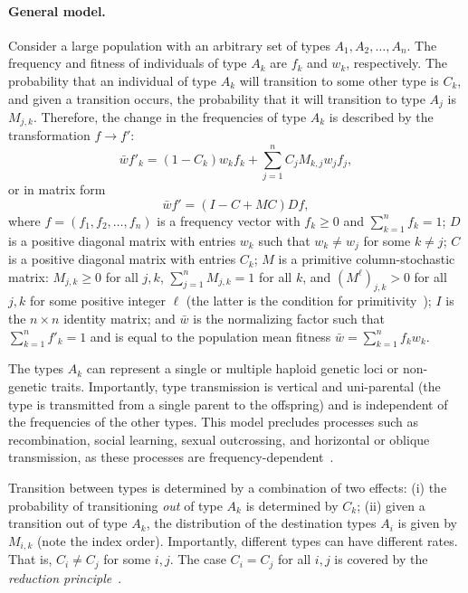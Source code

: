 \documentclass[12pt, twocolumn]{extarticle}
\newcommand{\ci}{I}
\begin{document}
\paragraph*{General model.}\label{sec:general_model}
Consider a large  population with an arbitrary set of types $A_1, A_2, \ldots, A_n$.
The frequency and fitness of individuals of type $A_k$ are $f_k$ and $w_k$, respectively.
The probability that an individual of type $A_k$ will transition to some other type is $C_k$, and given a transition occurs, the probability that it will transition to type $A_j$ is $M_{j,k}$.
Therefore, the change in the frequencies of type $A_k$ is described by the transformation $f \to f'$: 
\begin{equation}
\bar{w} f'_k = (1-C_k) w_k f_k + \sum_{j=1}^{n}{C_j M_{k,j} w_j f_j},
\label{eq:model_sum}
\end{equation}
or in matrix form
\begin{equation}
\bar{w} f' = (\ci - C + MC)D f,
\label{eq:model}
\end{equation}
where $f=(f_1, f_2, \ldots, f_n)$ is a frequency vector with $f_k\ge 0$ and  $\sum_{k=1}^n{f_k} = 1$;
$D$ is a positive diagonal matrix with entries $w_k$ such that $w_k \ne w_j$ for some $k \ne j$; 
$C$ is a positive diagonal  matrix with entries $C_k$;
$M$ is a primitive column-stochastic matrix: $M_{j,k} \ge 0$ for all $j,k$, $\sum_{j=1}^n {M_{j,k}} = 1$ for all $k$, and $(M^{\ell})_{j,k} > 0$ for all $j,k$ for some positive integer $\ell$ (the latter is the condition for primitivity~\citep[see][Appendix 3]{Otto2007});
$\ci$ is the $n\times n$ identity matrix;
and $\bar{w}$ is the normalizing factor such that $\sum_{k=1}^n{f'_k}=1$ and is equal to the population mean fitness $\bar w=\sum_{k=1}^n f_kw_k$.

The types $A_k$ can represent a single or multiple haploid genetic loci or non-genetic traits.
Importantly, type transmission is vertical and uni-parental (the type is transmitted from a single parent to the offspring) and is independent of the frequencies of the other types.
This model precludes processes such as recombination, social learning, sexual outcrossing, and horizontal or oblique transmission, as these processes are frequency-dependent~\citep[pg.~54]{Cavalli-Sforza1981}.

Transition between types is determined by a combination of two effects:
(i) the probability of transitioning \emph{out} of type $A_k$ is determined by $C_k$;
(ii) given a transition out of type $A_k$, the distribution of the destination types $A_i$ is given by $M_{i,k}$ (note the index order).
Importantly, different types can have different rates.
That is, $C_i \ne C_j$ for some $i,j$. The case $C_i = C_j$ for all $i,j$ is covered by the \emph{reduction principle}~\citep[see][]{Altenberg2017}.
\end{document}
